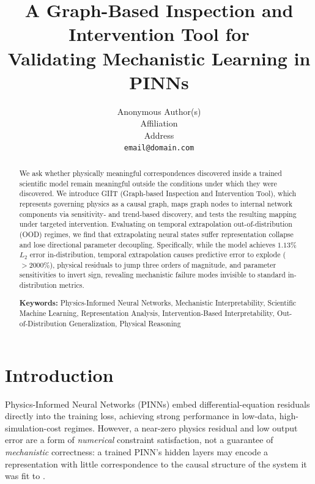 \documentclass{article}
\title{A Graph-Based Inspection and Intervention Tool for \\
Validating Mechanistic Learning in PINNs}
\author{%
  Anonymous Author(s) \\
  Affiliation \\
  Address \\
  \texttt{email@domain.com}
}
\begin{document}
\maketitle

\begin{abstract}
We ask whether physically meaningful correspondences discovered inside a
trained scientific model remain meaningful outside the conditions under
which they were discovered. We introduce GIIT (Graph-based Inspection and
Intervention Tool), which represents governing physics as a causal graph,
maps graph nodes to internal network components via sensitivity- and
trend-based discovery, and tests the resulting mapping under targeted
intervention. Evaluating on temporal extrapolation out-of-distribution (OOD)
regimes, we find that extrapolating neural states suffer representation collapse and lose directional parameter decoupling. 
Specifically, while the model achieves $1.13\%$ $L_2$ error in-distribution, temporal extrapolation causes 
predictive error to explode ($>2000\%$), physical residuals to jump three orders of magnitude, and parameter sensitivities to invert sign, 
revealing mechanistic failure modes invisible to standard in-distribution metrics.

\vspace{0.5em}
\noindent\textbf{Keywords:} Physics-Informed Neural Networks, Mechanistic Interpretability, Scientific Machine Learning, Representation Analysis, Intervention-Based Interpretability, Out-of-Distribution Generalization, Physical Reasoning
\end{abstract}

\section{Introduction}
\label{sec:intro}
Physics-Informed Neural Networks (PINNs) \citep{raissi2019pinn} embed
differential-equation residuals directly into the training loss, achieving
strong performance in low-data, high-simulation-cost regimes. However, a
near-zero physics residual and low output error are a form of
\emph{numerical} constraint satisfaction, not a guarantee of
\emph{mechanistic} correctness: a trained PINN's hidden layers may encode a
representation with little correspondence to the causal structure of the
system it was fit to \citep{wang2024understanding,krishnapriyan2021characterizing}.
\end{document}
